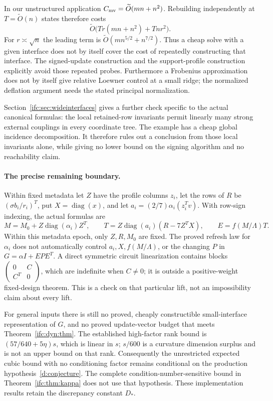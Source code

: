 \documentclass[11pt]{amsart}
\theoremstyle{definition}\newtheorem{definition}[theorem]{Definition}
\theoremstyle{remark}\newtheorem{remark}[theorem]{Remark}
\numberwithin{equation}{section}
\newcommand{\diag}{\operatorname{diag}}
\begin{document}
In our unstructured application $C_{\rm mv}=\widetilde O(mn+n^2)$.
Rebuilding independently at $T=\widetilde O(n)$ states therefore costs
\[
 \widetilde O\bigl(Tr(mn+n^2)+Tnr^2\bigr).
\]
For $r\asymp\sqrt n$ the leading term is
$\widetilde O(mn^{5/2}+n^{7/2})$.
Thus a cheap solve with a given interface does not by itself cover the
cost of repeatedly constructing that interface. The signed-update construction and the
support-profile construction explicitly avoid those repeated probes.
Furthermore a Frobenius approximation does not by itself give relative
Loewner control at a small ridge; the normalized deflation argument needs
the stated principal normalization.

Section~\ref{ifc:sec:wideinterfaces} gives a further check specific to the
actual canonical formulas: the local retained-row invariants permit
linearly many strong external couplings in every coordinate tree.
The example has a cheap global incidence decomposition. It therefore
rules out a conclusion from those local invariants alone, while giving
no lower bound on the signing algorithm and no reachability claim.

\paragraph{The precise remaining boundary.}
Within fixed metadata let $Z$ have the profile columns $z_i$, let the
rows of $R$ be $(\sigma b_i/r_i)^T$, put $X=\diag(x)$, and let
$a_i=(2/7)\alpha_i(z_i^Tv)$. With row-sign indexing, the actual formulas are
\[
 M=M_0+Z\diag(\alpha_i)Z^T,\qquad
 T=Z\diag(a_i)(R-7Z^TX),\qquad E=f(M/\Lambda)T.
\]
Within this metadata epoch, only $Z,R,M_0$ are fixed. The proved refresh law for $\alpha_i$ does not
automatically control $a_i,X,f(M/\Lambda)$, or the changing $P$ in
$G=\alpha I+EPE^T$. A direct symmetric circuit linearization contains
blocks $\left(\begin{smallmatrix}0&C\\C^T&0\end{smallmatrix}\right)$,
which are indefinite when $C\ne0$; it is outside a positive-weight
fixed-design theorem. This is a check on that particular lift, not an
impossibility claim about every lift.

For general inputs there is still no proved, cheaply constructible
small-interface representation of $G$, and no proved update-vector budget
that meets Theorem~\ref{ifc:dyn:thm}. The established high-factor rank bound
is $(57/640+5\eta)s$, which is linear in $s$; $s/600$ is a curvature
dimension surplus and is not an upper bound on that rank. Consequently
the unrestricted expected cubic bound with no conditioning factor remains
conditional on the production hypothesis~\eqref{d:conjecture}. The complete
condition-number-sensitive bound in Theorem~\ref{ifc:thm:kappa} does not
use that hypothesis. These implementation results retain the discrepancy constant $D_*$.
\end{document}
